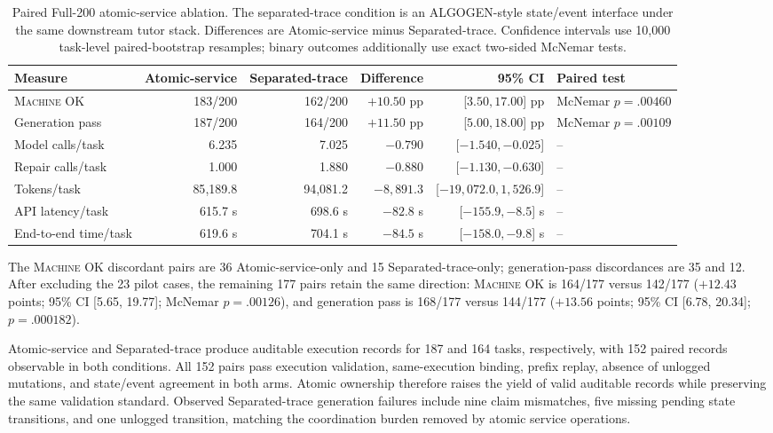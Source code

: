 \documentclass[letterpaper]{article}
\newcommand{\machineok}{\textsc{Machine OK}}
\begin{document}
\begin{table}[t]
\centering
\scriptsize
\setlength{\tabcolsep}{3.5pt}
\begin{tabular}{@{}lrrrrl@{}}
\toprule
Measure & Atomic-service & Separated-trace & Difference & 95\% CI & Paired test \\
\midrule
\machineok{} & 183/200 & 162/200 & $+10.50$ pp & [$3.50,17.00$] pp & McNemar $p=.00460$ \\
Generation pass & 187/200 & 164/200 & $+11.50$ pp & [$5.00,18.00$] pp & McNemar $p=.00109$ \\
Model calls/task & 6.235 & 7.025 & $-0.790$ & [$-1.540,-0.025$] & -- \\
Repair calls/task & 1.000 & 1.880 & $-0.880$ & [$-1.130,-0.630$] & -- \\
Tokens/task & 85{,}189.8 & 94{,}081.2 & $-8{,}891.3$ & [$-19{,}072.0,1{,}526.9$] & -- \\
API latency/task & 615.7 s & 698.6 s & $-82.8$ s & [$-155.9,-8.5$] s & -- \\
End-to-end time/task & 619.6 s & 704.1 s & $-84.5$ s & [$-158.0,-9.8$] s & -- \\
\bottomrule
\end{tabular}
\caption{Paired Full-200 atomic-service ablation. The separated-trace
condition is an ALGOGEN-style state/event interface under the same
downstream tutor stack. Differences are Atomic-service minus
Separated-trace. Confidence intervals use 10,000
task-level paired-bootstrap resamples; binary outcomes additionally use
exact two-sided McNemar tests.}
\label{tab:atomic-service-ablation}
\end{table}

The \machineok{} discordant pairs are 36 Atomic-service-only and 15
Separated-trace-only; generation-pass discordances are 35 and 12. After
excluding the 23 pilot cases, the remaining 177 pairs retain the same
direction: \machineok{} is 164/177 versus 142/177 (\(+12.43\) points;
95\% CI [5.65, 19.77]; McNemar \(p=.00126\)), and generation pass is
168/177 versus 144/177 (\(+13.56\) points; 95\% CI [6.78, 20.34];
\(p=.000182\)).

Atomic-service and Separated-trace produce auditable execution records
for 187 and 164 tasks, respectively, with 152 paired records observable
in both conditions. All 152 pairs pass execution validation,
same-execution binding, prefix replay, absence of unlogged mutations,
and state/event agreement in both arms. Atomic ownership therefore raises
the yield of valid auditable records while preserving the same
validation standard. Observed Separated-trace generation failures
include nine claim mismatches, five missing pending state transitions,
and one unlogged transition, matching the coordination burden removed by
atomic service operations.
\end{document}
